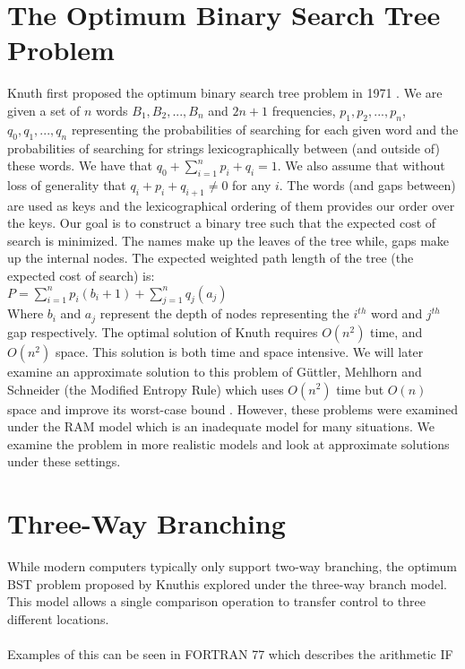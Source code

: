 \documentclass[letterpaper,12pt,titlepage,oneside,final]{book}
\theoremstyle{plain}
\begin{document}
\section{The Optimum Binary Search Tree Problem}

Knuth first proposed the optimum binary search tree problem in 1971 \cite{knuth1971optimum}. We are given a set of $n$ words $B_1, B_2, ..., B_n$ and $2n+1$ frequencies, ${p_1, p_2, ..., p_n}$, ${q_0, q_1, ..., q_n}$ representing the probabilities of searching for each given word and the probabilities of searching for strings lexicographically between (and outside of) these words. We have that $ q_0 + \sum\limits_{i=1}^n p_i+q_i = 1$. We also assume that without loss of generality that $q_i+p_i+q_{i+1} \neq 0$ for any $i$. The words (and gaps between) are used as keys and the lexicographical ordering of them provides our order over the keys. Our goal is to construct a binary tree such that the expected cost of search is minimized. The names make up the leaves of the tree while, gaps make up the internal nodes. The expected weighted path length of the tree (the expected cost of search) is: \\
$P = \sum_{i=1}^{n} p_i(b_i+1) + \sum_{j=1}^{n} q_j(a_j)$ \\
Where $b_i$ and $a_j$ represent the depth of nodes representing the $i^{th}$ word and $j^{th}$ gap respectively. The optimal solution of Knuth requires $O(n^2)$ time, and $O(n^2)$ space. This solution is both time and space intensive. We will later examine an approximate solution to this problem of G{\"u}ttler, Mehlhorn and Schneider (the Modified Entropy Rule) which uses $O(n^2)$ time but $O(n)$ space and improve its worst-case bound \cite{guttler1980binary}. However, these problems were examined under the RAM model which is an inadequate model for many situations. We examine the problem in more realistic models and look at approximate solutions under these settings.

\section{Three-Way Branching}


While modern computers typically only support two-way branching, the optimum BST problem proposed by Knuthis explored under the three-way branch model. This model allows a single comparison operation to transfer control to three different locations. \\~\\ Examples of this can be seen in FORTRAN 77 which describes the arithmetic IF \cite{fortran} \\
\end{document}
